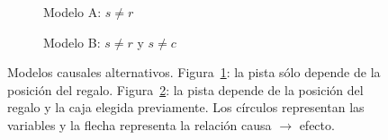 \documentclass[a4paper,11pt]{book}
\theoremstyle{definition}
\begin{document}
\begin{figure}[ht!]
  \centering
  \begin{subfigure}[b]{0.48\textwidth}
  \centering
  \caption{Modelo A: $s \neq r$}
  \label{fig:modelo_causal_1}
  \end{subfigure}
  \begin{subfigure}[b]{0.48\textwidth}
  \centering
  \caption{Modelo B: $s \neq r$ y $s \neq c$}
  \label{fig:modelo_causal_2}
  \end{subfigure}
  \caption{Modelos causales alternativos. Figura~\ref{fig:modelo_causal_1}: la pista s\'olo depende de la posici\'on del regalo. Figura~\ref{fig:modelo_causal_2}: la pista depende de la posici\'on del regalo y la caja elegida previamente.
  Los c\'irculos representan las variables y la flecha representa la relaci\'on causa $\rightarrow$ efecto.
  }
  \label{fig:modelos_causales}
\end{figure}
\end{document}
